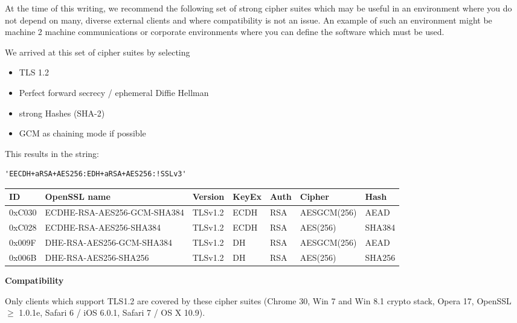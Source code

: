 At the time of this writing, we recommend the following set of strong cipher
suites which may be useful in an environment where you do not depend on many,
diverse external clients and where compatibility is not an issue.  An example
of such an environment might be machine 2 machine communications or corporate
environments where you can define the software which must be used.


We arrived at this set of cipher suites by selecting

\begin{itemize}
\item TLS 1.2
\item Perfect forward secrecy / ephemeral Diffie Hellman
\item strong Hashes (SHA-2)
\item GCM as chaining mode if possible 
\end{itemize}

This results in the string:

\begin{lstlisting}[breaklines]
'EECDH+aRSA+AES256:EDH+aRSA+AES256:!SSLv3'
\end{lstlisting}

%



\begin{center}
\begin{tabular}{| l | l | l | l | l| l | l |}
\hline
ID        & OpenSSL name                & Version & KeyEx & Auth & Cipher & Hash \\ \hline
0xC030 & ECDHE-RSA-AES256-GCM-SHA384 & TLSv1.2 & ECDH  &  RSA &AESGCM(256)  & AEAD   \\ \hline
0xC028 & ECDHE-RSA-AES256-SHA384     & TLSv1.2 & ECDH  &  RSA &AES(256)     & SHA384 \\ \hline
0x009F & DHE-RSA-AES256-GCM-SHA384   & TLSv1.2 & DH    &  RSA &AESGCM(256)  & AEAD   \\ \hline
0x006B & DHE-RSA-AES256-SHA256       & TLSv1.2 & DH    &  RSA &AES(256)     & SHA256 \\ \hline
\end{tabular}
\end{center}


\textbf{Compatibility}

Only clients which support TLS1.2 are covered by these cipher suites (Chrome 30,
Win 7 and Win 8.1 crypto stack, Opera 17, OpenSSL $\ge$ 1.0.1e, Safari 6 / iOS
6.0.1, Safari 7 / OS X 10.9).



